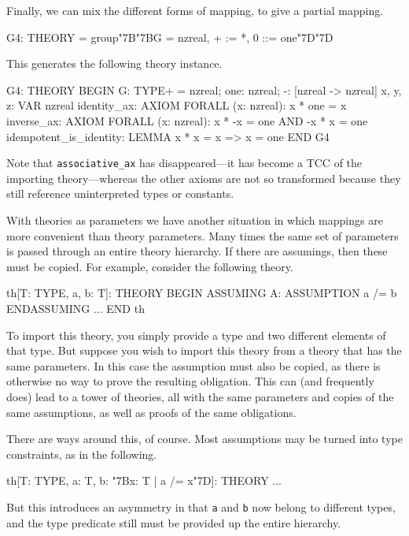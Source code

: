 \documentclass[11pt,twoside,openright,titlepage]{cslreport}
\def\mapb{\char"7B\char"7B}
\def\mape{\char"7D\char"7D}
\def\setb{\char"7B}
\def\sete{\char"7D}
\begin{document}
Finally, we can mix the different forms of mapping, to give a partial
mapping.
\begin{session}
G4: THEORY = group\mapb{}G = nzreal, + := *, 0 ::= one\mape{}
\end{session}
\noindent This generates the following theory instance.
\begin{session}
G4: THEORY
 BEGIN
  G: TYPE+ = nzreal;
  one: nzreal;
  -: [nzreal -> nzreal]
  x, y, z: VAR nzreal
  identity_ax: AXIOM FORALL (x: nzreal): x * one = x
  inverse_ax: AXIOM FORALL (x: nzreal):
                      x * -x = one AND -x * x = one
  idempotent_is_identity: LEMMA x * x = x => x = one
 END G4
\end{session}\label{group-instances-end}
Note that \texttt{associative\_ax} has disappeared---it has become a TCC
of the importing theory---whereas the other axioms are not so transformed
because they still reference uninterpreted types or constants.

With theories as parameters we have another situation in which mappings
are more convenient than theory parameters.  Many times the same set of
parameters is passed through an entire theory hierarchy.  If there are
assumings, then these must be copied.  For example, consider the
following theory.
\begin{session}
th[T: TYPE, a, b: T]: THEORY
 BEGIN
  ASSUMING
   A: ASSUMPTION a /= b
  ENDASSUMING
  ...
 END th
\end{session}
\noindent To import this theory, you simply provide a type and two
different elements of that type.  But suppose you wish to import this
theory from a theory that has the same parameters.  In this case the
assumption must also be copied, as there is otherwise no way to prove the
resulting obligation.  This can (and frequently does) lead to a tower of
theories, all with the same parameters and copies of the same assumptions,
as well as proofs of the same obligations.

There are ways around this, of course.  Most assumptions may be turned
into type constraints, as in the following.
\begin{session}
th[T: TYPE, a: T, b: \setb{}x: T | a /= x\sete{}]: THEORY
 ...
\end{session}
\noindent But this introduces an asymmetry in that \texttt{a} and
\texttt{b} now belong to different types, and the type predicate still
must be provided up the entire hierarchy.
\end{document}
